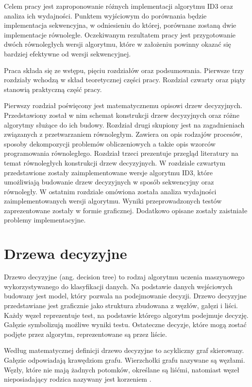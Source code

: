 \documentclass[12pt]{article}
\begin{document}
Celem pracy jest zaproponowanie różnych implementacji algorytmu ID3 oraz analiza ich wydajności.
Punktem wyjściowym do porównania będzie implementacja sekwencyjna, w odniesieniu do której, porównane zostaną dwie implementacje równoległe.
Oczekiwanym rezultatem pracy jest przygotowanie dwóch równoległych wersji algorytmu, które w założeniu powinny okazać się bardziej
efektywne od wersji sekwencyjnej.

Praca składa się ze wstępu, pięciu rozdziałów oraz podsumowania. Pierwsze trzy
rozdziały wchodzą w skład teoretycznej części pracy. Rozdział czwarty oraz piąty
stanowią praktyczną część pracy.

Pierwszy rozdział poświęcony jest matematycznemu opisowi drzew decyzyjnych.
Przedstawiony został w nim schemat konstrukcji drzew decyzyjnych oraz różne algorytmy służące
do ich budowy. Rozdział drugi skupiony jest na zagadnieniach związanych z przetwarzaniem równoległym.
Zawiera on opis rodzajów procesów, sposoby dekompozycji problemów obliczeniowych a także
opis wzorców programowania równoległego. Rozdział trzeci prezentuje przegląd literatury 
na temat równoległych konstrukcji drzew decyzyjnych. W rozdziale czwartym przedstawione
zostały zaimplementowane wersje algorytmu ID3, które umożliwiają budowanie drzew decyzyjnych w sposób
sekwencyjny oraz równoległy. W ostatnim rozdziale omówiona została analiza wydajności zaimplementowanych
wersji algorytmu. Wyniki przeprowadzonych testów zaprezentowane zostały w formie graficznej.
Dodatkowo opisane zostały zaistniałe problemy implementacyjne. 
\newpage

\section{Drzewa decyzyjne}
Drzewo decyzyjne (ang. decision tree) to rodzaj algorytmu uczenia maszynowego
wykorzystywanego do klasyfikacji danych. Na podstawie danych wejściowych budowany jest model,
który pozwala na podejmowanie decyzji. Drzewo decyzyjne przedstawiane jest graficznie jako
struktura zbudowana z węzłów, gałęzi i liści. Każdy węzeł reprezentuje test, na podstawie
którego algorytm podejmuje decyzję. Gałęzie symbolizują możliwe wyniki testu. Ostateczne
decyzje, które mogą zostać podjęte przez algorytm, reprezentowane są przez liście.

Według matematycznej definicji drzewo decyzyjne to acykliczny graf skierowany.
Gałęzie odpowiadają krawędziom grafu. Wierzchołki grafu nazywane są węzłami. Węzły, które
nie mają żadnych potomków, określane są liśćmi, natomiast węzeł nieposiadający rodzica
nazywany jest korzeniem \cite{algorytmy-do-konstruowania-drzew-decyzyjnych}.
\end{document}
